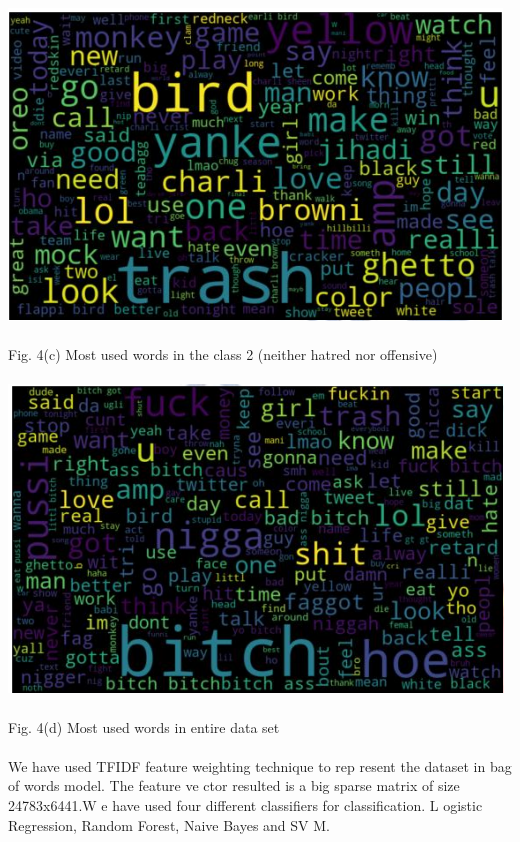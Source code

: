 \documentclass{letter}
\begin{document}
\begin{multicols}{2}
\newpage

\includegraphics[width=1\linewidth]{dd}\\ \\
Fig. 4(c) Most used words in the class 2 (neither hatred 
nor offensive) \\ \\
\includegraphics[width=1\linewidth]{ee}\\  \\
Fig. 4(d) Most used words in entire data set\\ \\
We have used TFIDF feature weighting technique to rep
resent the dataset in bag of words model. The feature ve
ctor resulted is a big sparse matrix of size 24783x6441.W
e have used four different classifiers for classification. L
ogistic Regression, Random Forest, Naive Bayes and SV
M. \\ \\



\end{multicols}
\end{document}
